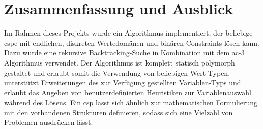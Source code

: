\section{Zusammenfassung und Ausblick}
Im Rahmen dieses Projekts wurde ein Algorithmus implementiert, der beliebige \acl*{csp}e mit endlichen, diskreten Wertedomänen und binären Constraints lösen kann. Dazu wurde eine
rekursive Backtracking-Suche in Kombination mit dem \ac*{ac}-3 Algorithmus verwendet. Der Algorithmus ist komplett statisch polymorph gestaltet und erlaubt somit die Verwendung von
beliebigen Wert-Typen, unterstützt Erweiterungen des zur Verfügung gestellten Variablen-Typs und erlaubt das Angeben von benutzerdefinierten Heuristiken zur Variablenauswahl während
des Lösens. Ein \ac*{csp} lässt sich ähnlich zur mathematischen Formulierung mit den vorhandenen Strukturen definieren, sodass sich eine Vielzahl von Problemen ausdrücken lässt. 